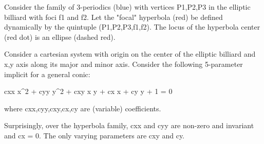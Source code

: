 Consider the family of 3-periodics (blue) with vertices P1,P2,P3 in the elliptic billiard with foci f1 and f2. Let the "focal" hyperbola (red) be defined dynamically by the quintuple (P1,P2,P3,f1,f2). The locus of the hyperbola center (red dot) is an ellipse (dashed red).

Consider a cartesian system with origin on the center of the elliptic billiard and x,y axis along its major and minor axis. Consider the following 5-parameter implicit for a general conic:

cxx x^2 + cyy y^2 + cxy x y + cx x + cy y + 1 = 0

where cxx,cyy,cxy,cx,cy are (variable) coefficients.

Surprisingly, over the hyperbola family, cxx and cyy are non-zero and invariant and cx = 0. The only varying parameters are cxy and cy.